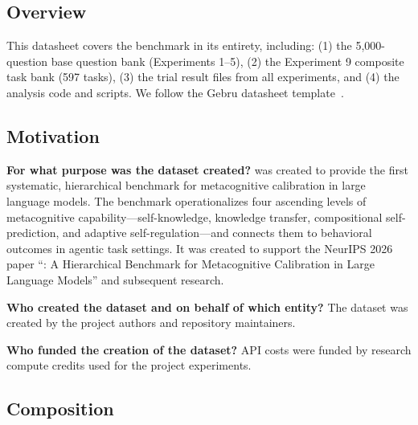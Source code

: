 
\subsection*{Overview}

This datasheet covers the \mirror{} benchmark in its entirety, including: (1) the
5,000-question base question bank (Experiments 1--5), (2) the Experiment 9 composite
task bank (597 tasks), (3) the trial result files from all experiments, and (4) the
analysis code and scripts. We follow the Gebru \etal{} datasheet template~\citep{gebru2021datasheets}.

\subsection*{Motivation}

\textbf{For what purpose was the dataset created?}
\mirror{} was created to provide the first systematic, hierarchical benchmark for
metacognitive calibration in large language models. The benchmark operationalizes
four ascending levels of metacognitive capability---self-knowledge, knowledge transfer,
compositional self-prediction, and adaptive self-regulation---and connects them to
behavioral outcomes in agentic task settings. It was created to support the NeurIPS
2026 paper ``\mirror{}: A Hierarchical Benchmark for Metacognitive Calibration in
Large Language Models'' and subsequent research.

\textbf{Who created the dataset and on behalf of which entity?}
The dataset was created by the \mirror{} project authors and repository maintainers.

\textbf{Who funded the creation of the dataset?}
API costs were funded by research compute credits used for the project experiments.

\subsection*{Composition}

